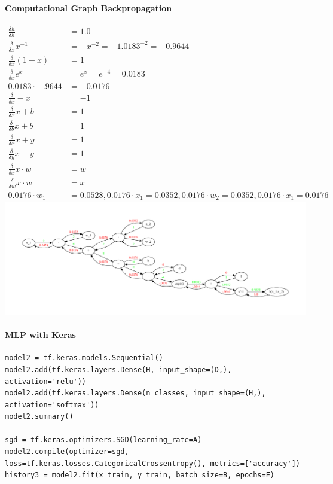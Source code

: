 \documentclass[11pt]{article}
\begin{document}
\paragraph{Computational Graph Backpropagation}
\begin{align*}
	\frac{\delta h}{\delta h} &= 1.0\\
	\frac{\delta}{\delta x} x^{-1} &= -x^{-2} = - 1.0183^{-2} = -0.9644\\
	\frac{\delta}{\delta x} (1+x) &= 1\\
	\frac{\delta}{\delta x} e^x &= e^x = e^{-4} = 0.0183\\
	0.0183\cdot -.9644 &= -0.0176\\
	\frac{\delta}{\delta x} -x &= -1\\
	\frac{\delta}{\delta x} x+b &= 1\\
	\frac{\delta}{\delta b} x+b &= 1\\
	\frac{\delta}{\delta x} x+y &= 1\\
	\frac{\delta}{\delta y} x+y &= 1\\
	\frac{\delta}{\delta x} x\cdot w &= w\\
	\frac{\delta}{\delta w} x\cdot w &= x\\
	0.0176\cdot w_1 &= 0.0528, 0.0176\cdot x_1 = 0.0352, 0.0176\cdot w_2 = 0.0352, 0.0176\cdot x_1 = 0.0176
\end{align*}
\includegraphics[width=\linewidth]{pdf/computational_graph_backprop.pdf}

\paragraph{MLP with Keras}
\begin{verbatim}
model2 = tf.keras.models.Sequential()
model2.add(tf.keras.layers.Dense(H, input_shape=(D,), activation='relu'))
model2.add(tf.keras.layers.Dense(n_classes, input_shape=(H,), activation='softmax'))
model2.summary()

sgd = tf.keras.optimizers.SGD(learning_rate=A)
model2.compile(optimizer=sgd, loss=tf.keras.losses.CategoricalCrossentropy(), metrics=['accuracy'])
history3 = model2.fit(x_train, y_train, batch_size=B, epochs=E)
\end{verbatim}
\end{document}
